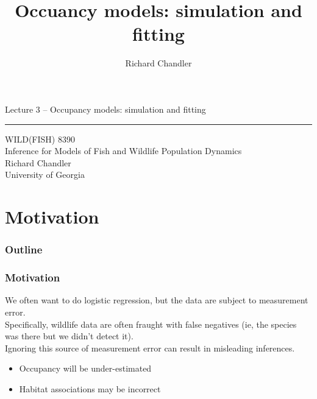 \documentclass[color=usenames,dvipsnames]{beamer}\usepackage[]{graphicx}\usepackage[]{xcolor}
\title{Occuancy models: simulation and fitting }
\author{Richard Chandler}
\begin{document}
\begin{frame}[plain]
  \LARGE
  \centering
  {\huge Lecture 3 -- Occupancy models: simulation and fitting} \\
  {\color{default} \rule{\textwidth}{0.1pt}}
  \vfill
  \large
  WILD(FISH) 8390 \\
  Inference for Models of Fish and Wildlife Population Dynamics \\
  \vfill
  \large
  Richard Chandler \\
  University of Georgia \\
\end{frame}






\section{Motivation}



\begin{frame}[plain]
  \frametitle{Outline}
  \Large
\end{frame}



\begin{frame}
  \frametitle{Motivation}
  We often want to do logistic regression, but the data are subject
  to measurement error. \\  
  \pause
  \vfill
  Specifically, wildlife data are often fraught with false negatives
  (ie, the species was there but we didn't detect it). \\
  \pause
  \vfill
  Ignoring this source of measurement error can result in misleading
  inferences. \\
  \begin{itemize}
    \item Occupancy will be under-estimated
    \item Habitat associations may be incorrect
  \end{itemize}
\end{frame}


\end{document}

